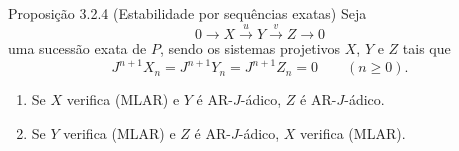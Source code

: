 \begin{statement}{Proposição 3.2.4 (Estabilidade por sequências exatas)}
Seja
\[
0\longrightarrow X\stackrel{u}{\longrightarrow}Y\stackrel{v}{\longrightarrow}Z\longrightarrow0
\]
uma sucessão exata de $P$, sendo os sistemas projetivos $X$, $Y$ e $Z$ tais que
\[
J^{n+1}X_n=J^{n+1}Y_n=J^{n+1}Z_n=0\qquad(n\ge0).
\]
\begin{enumerate}[label=(\roman*)]
\item Se $X$ verifica (MLAR) e $Y$ é AR-$J$-ádico, $Z$ é AR-$J$-ádico.
\item Se $Y$ verifica (MLAR) e $Z$ é AR-$J$-ádico, $X$ verifica (MLAR).
\end{enumerate}
\end{statement}

